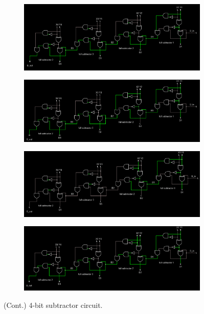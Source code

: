 \documentclass{article}
\begin{document}
	
	\begin{figure}
		\centering
		
		\begin{subfigure}[t]{.8\textwidth}
			\centering
			\includegraphics[width=\textwidth]{4bit/4bit_001.png}
		\end{subfigure}
		
		\begin{subfigure}[b]{0.8\textwidth}
			\includegraphics[width=\textwidth]{4bit/4bit_011.png}
		\end{subfigure}
		
		\begin{subfigure}[b]{0.8\textwidth}
			\includegraphics[width=\textwidth]{4bit/4bit_101.png}
		\end{subfigure}
		
		\begin{subfigure}[b]{0.8\textwidth}
			\includegraphics[width=\textwidth]{4bit/4bit_111.png}
		\end{subfigure}
		\caption{(Cont.) 4-bit subtractor circuit.}
		\label{4bit2}
	\end{figure}
\end{document}
